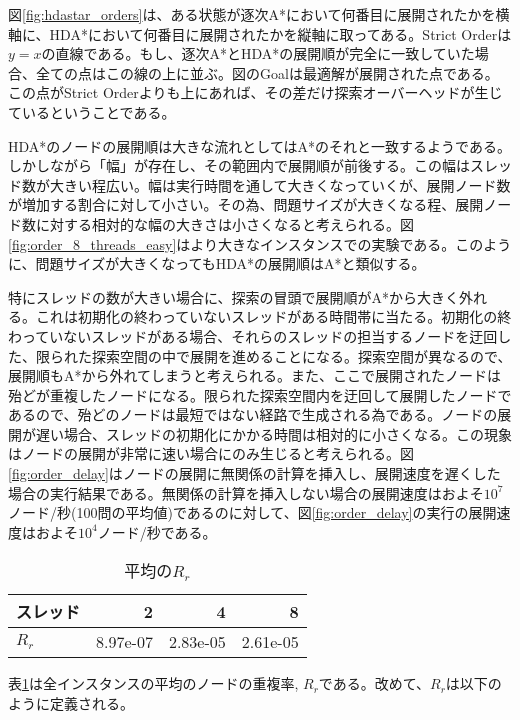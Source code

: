 \documentclass[uplatex]{jsarticle}
\begin{document}
図\ref{fig:hdastar_orders}は、ある状態が逐次A*において何番目に展開されたかを横軸に、HDA*において何番目に展開されたかを縦軸に取ってある。Strict Orderは$y = x$の直線である。もし、逐次A*とHDA*の展開順が完全に一致していた場合、全ての点はこの線の上に並ぶ。図のGoalは最適解が展開された点である。この点がStrict Orderよりも上にあれば、その差だけ探索オーバーヘッドが生じているということである。

HDA*のノードの展開順は大きな流れとしてはA*のそれと一致するようである。しかしながら「幅」が存在し、その範囲内で展開順が前後する。この幅はスレッド数が大きい程広い。幅は実行時間を通して大きくなっていくが、展開ノード数が増加する割合に対して小さい。その為、問題サイズが大きくなる程、展開ノード数に対する相対的な幅の大きさは小さくなると考えられる。図\ref{fig:order_8_threads_easy}はより大きなインスタンスでの実験である。このように、問題サイズが大きくなってもHDA*の展開順はA*と類似する。

特にスレッドの数が大きい場合に、探索の冒頭で展開順がA*から大きく外れる。これは初期化の終わっていないスレッドがある時間帯に当たる。初期化の終わっていないスレッドがある場合、それらのスレッドの担当するノードを迂回した、限られた探索空間の中で展開を進めることになる。探索空間が異なるので、展開順もA*から外れてしまうと考えられる。また、ここで展開されたノードは殆どが重複したノードになる。限られた探索空間内を迂回して展開したノードであるので、殆どのノードは最短ではない経路で生成される為である。ノードの展開が遅い場合、スレッドの初期化にかかる時間は相対的に小さくなる。この現象はノードの展開が非常に速い場合にのみ生じると考えられる。図\ref{fig:order_delay}はノードの展開に無関係の計算を挿入し、展開速度を遅くした場合の実行結果である。無関係の計算を挿入しない場合の展開速度はおよそ$10^7$ノード/秒(100問の平均値)であるのに対して、図\ref{fig:order_delay}の実行の展開速度はおよそ$10^4$ノード/秒である。


\begin{table}[h]
	\centering
	\begin{tabular}{lrrr} \hline
		スレッド  & 2 & 4 & 8 \\ \hline
		$R_{r}$ & 8.97e-07 & 2.83e-05 & 2.61e-05 \\ \hline
	\end{tabular}
	\caption{平均の$R_{r}$}
	\label{hdastar_duplication}
\end{table}


表\ref{hdastar_duplication}は全インスタンスの平均のノードの重複率, $R_{r}$である。改めて、$R_{r}$は以下のように定義される。
\end{document}
